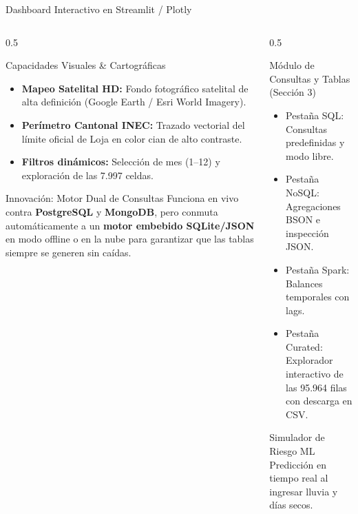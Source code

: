 \documentclass[aspectratio=169,11pt]{beamer}
\newcommand{\seccionactual}{Sustentaci\'on Final}
\begin{document}
\renewcommand{\seccionactual}{Dashboard}
\begin{frame}{Dashboard Interactivo en Streamlit / Plotly}
  \begin{columns}
    \begin{column}{0.5\textwidth}
      \begin{block}{Capacidades Visuales \& Cartogr\'aficas}\scriptsize
        \begin{itemize}
          \item \textbf{Mapeo Satelital HD:} Fondo fotogr\'afico satelital de alta definici\'on (Google Earth / Esri World Imagery).
          \item \textbf{Per\'imetro Cantonal INEC:} Trazado vectorial del l\'imite oficial de Loja en color cian de alto contraste.
          \item \textbf{Filtros din\'amicos:} Selecci\'on de mes (1--12) y exploraci\'on de las 7.997 celdas.
        \end{itemize}
      \end{block}
      \begin{alertblock}{Innovaci\'on: Motor Dual de Consultas}\scriptsize
        Funciona en vivo contra \textbf{PostgreSQL} y \textbf{MongoDB}, pero conmuta autom\'aticamente a un \textbf{motor embebido SQLite/JSON} en modo offline o en la nube para garantizar que las tablas siempre se generen sin ca\'idas.
      \end{alertblock}
    \end{column}
    \begin{column}{0.5\textwidth}
      \begin{exampleblock}{M\'odulo de Consultas y Tablas (Secci\'on 3)}\scriptsize
        \begin{itemize}
          \item Pesta\~na SQL: Consultas predefinidas y modo libre.
          \item Pesta\~na NoSQL: Agregaciones BSON e inspecci\'on JSON.
          \item Pesta\~na Spark: Balances temporales con lags.
          \item Pesta\~na Curated: Explorador interactivo de las 95.964 filas con descarga en CSV.
        \end{itemize}
      \end{exampleblock}
      \begin{block}{Simulador de Riesgo ML}\scriptsize
        Predicci\'on en tiempo real al ingresar lluvia y d\'ias secos.
      \end{block}
    \end{column}
  \end{columns}
\end{frame}
\end{document}
